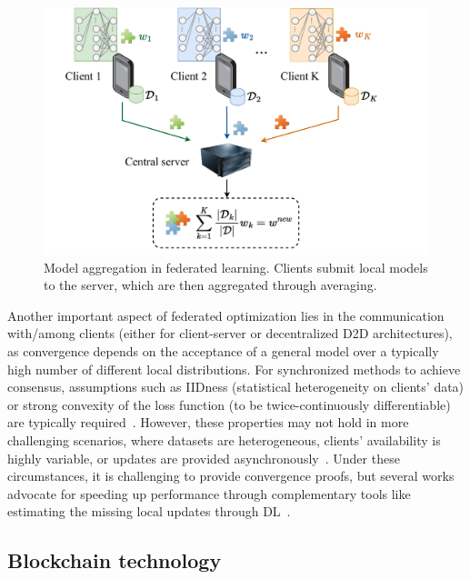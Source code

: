 \documentclass[lettersize,journal]{IEEEtran}
\begin{document}
\begin{figure}[ht!]
    \centering
    \includegraphics[width=\linewidth]{img/model_aggregation.pdf}
    \caption{Model aggregation in federated learning. Clients submit local models to the server, which are then aggregated through averaging.}
    \label{fig:model_aggregation}
\end{figure}

Another important aspect of federated optimization lies in the communication with/among clients (either for client-server or decentralized D2D architectures), as convergence depends on the acceptance of a general model over a typically high number of different local distributions. For synchronized methods to achieve consensus, assumptions such as IIDness (statistical heterogeneity on clients' data) or strong convexity of the loss function (to be twice-continuously differentiable) are typically required~\cite{chen2020convergence,li2018federated,wang2019adaptive}. However, these properties may not hold in more challenging scenarios, where datasets are heterogeneous, clients' availability is highly variable, or updates are provided asynchronously~\cite{xie2019asynchronous,chen2020asynchronous}. Under these circumstances, it is challenging to provide convergence proofs, but several works advocate for speeding up performance through complementary tools like estimating the missing local updates through DL~\cite{chen2020convergence}. 

\subsection{Blockchain technology}
\end{document}
